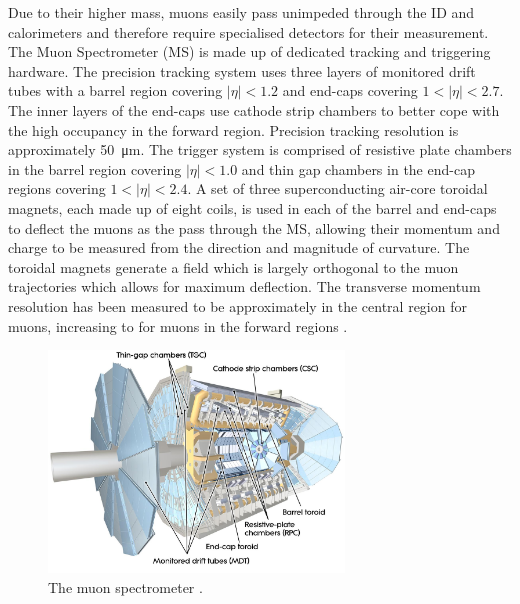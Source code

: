 Due to their higher mass, muons easily pass unimpeded through the ID and calorimeters and therefore require specialised detectors for their measurement.
The Muon Spectrometer (MS) is made up of dedicated tracking and triggering hardware.
The precision tracking system uses three layers of monitored drift tubes with a barrel region covering $|\eta| < 1.2$ and end-caps covering $1 < |\eta| < 2.7$. The inner layers of the end-caps use cathode strip chambers to better cope with the high occupancy in the forward region.
Precision tracking resolution is approximately \SI{50}{\micro\meter}.
The trigger system is comprised of resistive plate chambers in the barrel region covering $|\eta| < 1.0$ and thin gap chambers in the end-cap regions covering $1 < |\eta| < 2.4$.
A set of three superconducting air-core toroidal magnets, each made up of eight coils, is used in each of the barrel and end-caps to deflect the muons as the pass through the MS, allowing their momentum and charge to be measured from the direction and magnitude of curvature.
The toroidal magnets generate a field which is largely orthogonal to the muon trajectories which allows for maximum deflection.
The transverse momentum resolution has been measured to be approximately  in the central region for \lowpt muons, increasing to  for \highpt muons in the forward regions \cite{Artoni:1953654}.
%
\begin{figure}[!htpb]
  \centering
  \includegraphics[width=0.7\textwidth]{chapters/2.detector/figs/atlas_muon_system.jpg}
  \caption{The \ATLAS muon spectrometer \cite{atlasmuon}.}
  \label{fig:atlas_muon_system}
\end{figure}
%


